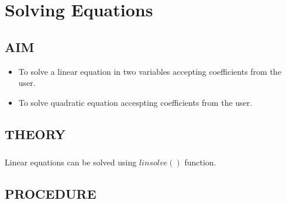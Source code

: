 \chapter [Solving Equations]{Solving Equations}


\section*{AIM}
\begin{itemize}
\item
To solve a linear equation in two variables accepting coefficients from the user.
\item 
To solve quadratic equation accespting coefficients from the user.

\end{itemize}

\section*{THEORY}
\paragraph{}

Linear equations can be solved using $linsolve()$ function.

\paragraph{}

\section*{PROCEDURE}

